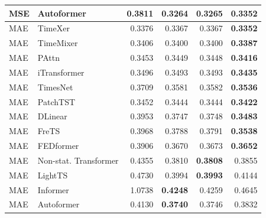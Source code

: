 \begin{longtable}{llrrrr}
MSE & Autoformer & 0.3811 & \textbf{0.3264} & 0.3265 & 0.3352 \\
\midrule
MAE & TimeXer & 0.3376 & 0.3367 & 0.3367 & \textbf{0.3352} \\
MAE & TimeMixer & 0.3406 & 0.3400 & 0.3400 & \textbf{0.3387} \\
MAE & PAttn & 0.3453 & 0.3449 & 0.3448 & \textbf{0.3416} \\
MAE & iTransformer & 0.3496 & 0.3493 & 0.3493 & \textbf{0.3435} \\
MAE & TimesNet & 0.3709 & 0.3581 & 0.3582 & \textbf{0.3536} \\
MAE & PatchTST & 0.3452 & 0.3444 & 0.3444 & \textbf{0.3422} \\
MAE & DLinear & 0.3953 & 0.3747 & 0.3748 & \textbf{0.3483} \\
MAE & FreTS & 0.3968 & 0.3788 & 0.3791 & \textbf{0.3538} \\
MAE & FEDformer & 0.3906 & 0.3670 & 0.3673 & \textbf{0.3652} \\
MAE & Non-stat. Transformer & 0.4355 & 0.3810 & \textbf{0.3808} & 0.3855 \\
MAE & LightTS & 0.4730 & 0.3994 & \textbf{0.3993} & 0.4144 \\
MAE & Informer & 1.0738 & \textbf{0.4248} & 0.4259 & 0.4645 \\
MAE & Autoformer & 0.4130 & \textbf{0.3740} & 0.3746 & 0.3832 \\
\end{longtable}
\endgroup

